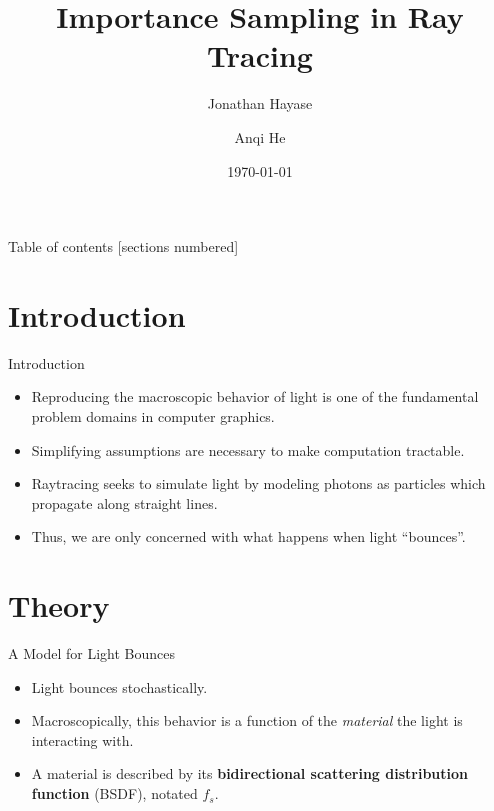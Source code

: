 \documentclass[10pt]{beamer}
\title{Importance Sampling in Ray Tracing}
\subtitle{}
\date{\today}
\author{Jonathan Hayase \and Anqi He}
\institute{Math 164 -- Scientific Computing -- FA18}
\begin{document}
\maketitle

\begin{frame}{Table of contents}
  [sections numbered]
  \tableofcontents[hideallsubsections]
\end{frame}

\section{Introduction}

\begin{frame}{Introduction}
  \begin{itemize}
  \item Reproducing the macroscopic behavior of light is one of the fundamental problem domains in computer graphics.
  \item Simplifying assumptions are necessary to make computation tractable.
  \item Raytracing seeks to simulate light by modeling photons as particles which propagate along straight lines.
  \item Thus, we are only concerned with what happens when light ``bounces''.
  \end{itemize}
\end{frame}

\section{Theory}

\begin{frame}{A Model for Light Bounces}
  \begin{itemize}
  \item Light bounces stochastically.
  \item Macroscopically, this behavior is a function of the \textit{material} the light is interacting with.
  \item A material is described by its \textbf{bidirectional scattering distribution function} (BSDF), notated \(f_s\).
  \end{itemize}
\end{frame}
\end{document}
